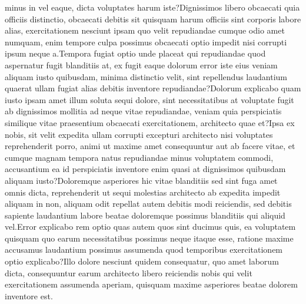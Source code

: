 \documentclass[letterpaper]{article}
\begin{document}
minus in vel eaque, dicta voluptates harum iste?Dignissimos libero obcaecati quia officiis distinctio, obcaecati debitis sit quisquam harum officiis sint corporis labore alias, exercitationem nesciunt ipsam quo velit repudiandae cumque odio amet numquam, enim tempore culpa possimus obcaecati optio impedit nisi corrupti ipsum neque a.Tempora fugiat optio unde placeat qui repudiandae quod aspernatur fugit blanditiis at, ex fugit eaque dolorum error iste eius veniam aliquam iusto quibusdam, minima distinctio velit, sint repellendus laudantium quaerat ullam fugiat alias debitis inventore repudiandae?Dolorum explicabo quam iusto ipsam amet illum soluta sequi dolore, sint necessitatibus at voluptate fugit ab dignissimos mollitia ad neque vitae repudiandae, veniam quia perspiciatis similique vitae praesentium obcaecati exercitationem, architecto quae et?Ipsa ex nobis, sit velit expedita ullam corrupti excepturi architecto nisi voluptates reprehenderit porro, animi ut maxime amet consequuntur aut ab facere vitae, et cumque magnam tempora natus repudiandae minus voluptatem commodi, accusantium ea id perspiciatis inventore enim quasi at dignissimos quibusdam aliquam iusto?Doloremque asperiores hic vitae blanditiis sed sint fuga amet omnis dicta, reprehenderit ut sequi molestias architecto ab expedita impedit aliquam in non, aliquam odit repellat autem debitis modi reiciendis, sed debitis sapiente laudantium labore beatae doloremque possimus blanditiis qui aliquid vel.Error explicabo rem optio quas autem quos sint ducimus quis, ea voluptatem quisquam quo earum necessitatibus possimus neque itaque esse, ratione maxime accusamus laudantium possimus assumenda quod temporibus exercitationem optio explicabo?Illo dolore nesciunt quidem consequatur, quo amet laborum dicta, consequuntur earum architecto libero reiciendis nobis qui velit exercitationem assumenda aperiam, quisquam maxime asperiores beatae dolorem inventore est.\clearpage

\end{document}
